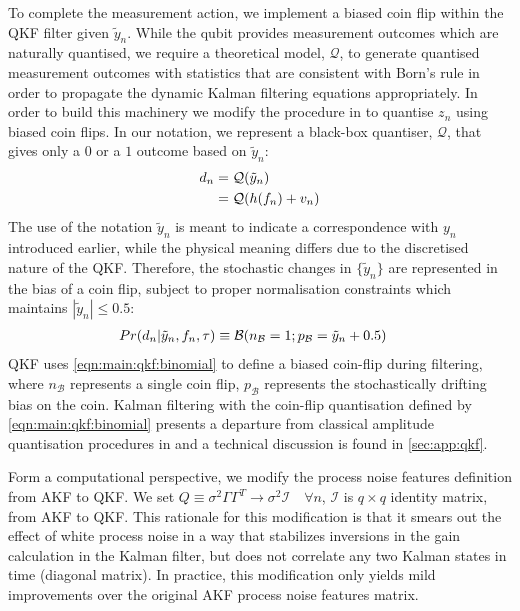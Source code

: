 To complete the measurement action, we implement a biased coin flip within the QKF filter given $\tilde{y}_n$.  While the qubit provides measurement outcomes which are naturally quantised, we require a theoretical model, $\mathcal{Q}$, to generate quantised measurement outcomes with statistics that are consistent with Born's rule in order to propagate the dynamic Kalman filtering equations appropriately. In order to build this machinery we modify the procedure in \cite{karlsson2005} to quantise $z_n$ using biased coin flips. In our notation, we represent a black-box quantiser, $\mathcal{Q}$, that gives only a $0$ or a $1$ outcome based on $\tilde{y}_n$:
\begin{align}
d_n &= \mathcal{Q}(\tilde{y}_n)\\
&=  \mathcal{Q}(h(f_n) + v_n)
\end{align}
The use of the notation $\tilde{y}_n$ is meant to indicate a correspondence with $y_{n}$ introduced earlier, while the physical meaning differs due to the discretised nature of the QKF.  Therefore, the stochastic changes in $\{ \tilde{y}_n\}$ are represented in the bias of a coin flip, subject to proper normalisation constraints which maintains $|\tilde{y}_n| \leq 0.5$:
\begin{align}
Pr(d_n| \tilde{y}_n, f_{n}, \tau) & \equiv \mathcal{B}(n_{\mathcal{B}}=1;p_{\mathcal{B}}= \tilde{y}_n + 0.5 ) \label{eqn:main:qkf:binomial}
\end{align}
QKF uses \cref{eqn:main:qkf:binomial} to define a biased coin-flip during filtering, where $n_{\mathcal{B}}$ represents a single coin flip, $p_{\mathcal{B}}$ represents the stochastically drifting bias on the coin. Kalman filtering with the coin-flip quantisation defined by \cref{eqn:main:qkf:binomial} presents a departure from classical amplitude quantisation procedures in \cite{widrow1996,karlsson2005} and a technical discussion is found in \cref{sec:app:qkf}.

Form a computational perspective, we modify the process noise features definition from AKF to QKF. We set $Q \equiv \sigma^2\Gamma \Gamma^T \to \sigma^2 \mathcal{I} \quad \forall n $, $\mathcal{I}$ is $q\times q$ identity matrix, from AKF to QKF. This rationale for this modification is that it smears out the effect of white process noise in a way that stabilizes inversions in the gain calculation in the Kalman filter, but does not correlate any two Kalman states in time (diagonal matrix). In practice, this modification only yields mild improvements over the original AKF process noise features matrix.

